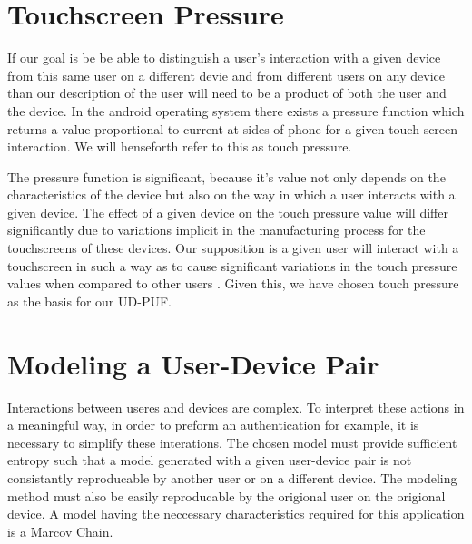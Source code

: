 \documentclass{acm_proc_article-sp}
\begin{document}
\section{Touchscreen Pressure}
\label{sec:touchscreen}
If our goal is be be able to distinguish a user's interaction with a given device from this same user on a different devie and from different users on any device than our description of the user will need to be a product of both the user and the device. In the android operating system there exists a pressure function which returns a value proportional to current at sides of phone for a given touch screen interaction. \cite{zhu2013sensec} We will henseforth refer to this as touch pressure. 

The pressure function is significant, because it's value not only depends on the characteristics of the device but also on the way in which a user interacts with a given device. The effect of a given device on the touch pressure value will differ significantly due to variations implicit in the manufacturing process for the touchscreens of these devices. \cite{manufacturing_differences} Our supposition is a given user will interact with a touchscreen in such a way as to cause significant variations in the touch pressure values when compared to other users \cite{user_touchscreen_interations}.  Given this, we have chosen touch pressure as the basis for our UD-PUF.

\section{Modeling a User-Device Pair}
\label{sec:modeling}
Interactions between useres and devices are complex. To interpret these actions in a meaningful way, in order to preform an authentication for example, it is necessary to simplify these interations. The chosen model must provide sufficient entropy such that a model generated with a given user-device pair is not consistantly reproducable by another user or on a different device. The modeling method must also be easily reproducable by the origional user on the origional device. A model having the neccessary characteristics required for this application is a Marcov Chain.
\end{document}
